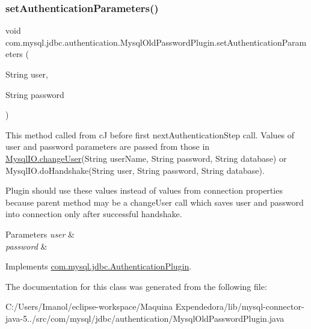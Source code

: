 \subsubsection{\texorpdfstring{set\+Authentication\+Parameters()}{setAuthenticationParameters()}}
{\footnotesize\ttfamily void com.\+mysql.\+jdbc.\+authentication.\+Mysql\+Old\+Password\+Plugin.\+set\+Authentication\+Parameters (\begin{DoxyParamCaption}\item[{String}]{user,  }\item[{String}]{password }\end{DoxyParamCaption})}

This method called from cJ before first next\+Authentication\+Step call. Values of user and password parameters are passed from those in \mbox{\hyperlink{classcom_1_1mysql_1_1jdbc_1_1_mysql_i_o_a2b65fc2cb7cccdb5923da263d37019ad}{Mysql\+I\+O.\+change\+User}}(String user\+Name, String password, String database) or Mysql\+I\+O.\+do\+Handshake(String user, String password, String database).

Plugin should use these values instead of values from connection properties because parent method may be a change\+User call which saves user and password into connection only after successful handshake.


\begin{DoxyParams}{Parameters}
{\em user} & \\
\hline
{\em password} & \\
\hline
\end{DoxyParams}


Implements \mbox{\hyperlink{interfacecom_1_1mysql_1_1jdbc_1_1_authentication_plugin_af47d83abdb04823681f23b027ec19379}{com.\+mysql.\+jdbc.\+Authentication\+Plugin}}.



The documentation for this class was generated from the following file\+:\begin{DoxyCompactItemize}
\item 
C\+:/\+Users/\+Imanol/eclipse-\/workspace/\+Maquina Expendedora/lib/mysql-\/connector-\/java-\/5../src/com/mysql/jdbc/authentication/Mysql\+Old\+Password\+Plugin.\+java\end{DoxyCompactItemize}
